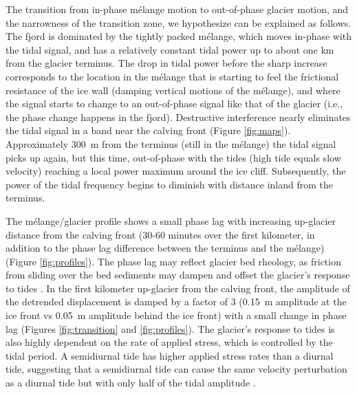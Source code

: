 The transition from in-phase m\'elange motion to out-of-phase glacier motion, and the narrowness of the transition zone, we hypothesize can be explained as follows. The fjord is dominated by the tightly packed m\'elange, which moves in-phase with the tidal signal, and has a relatively constant tidal power up to about one km from the glacier terminus. The drop in tidal power before the sharp increase corresponds to the  location in the m\'elange that is starting to feel the frictional resistance of the ice wall (damping vertical motions of the m\'elange), and where the signal starts to change to an out-of-phase signal like that of the glacier (i.e., the phase change happens in the fjord). Destructive interference nearly eliminates the tidal signal in a band near the calving front (Figure \ref{fig:maps}).  Approximately 300~m from the terminus (still in the m\'elange) the tidal signal picks up again, but this time, out-of-phase with the tides (high tide equals slow velocity) reaching a local power maximum around the ice cliff.  Subsequently, the power of the tidal frequency begins to diminish with distance inland from the terminus. 


The m\'elange/glacier profile shows a small phase lag with increasing up-glacier
distance from the calving front (30-60 minutes over the first
kilometer, in addition to the phase lag difference between the terminus and the m\'elange) (Figure \ref{fig:profiles}). The phase lag may reflect glacier bed rheology,
as friction from sliding over the bed sediments may dampen and offset
the glacier's response to tides \citep{walker2014ice}. 
In the first kilometer up-glacier from the calving front, the amplitude of the detrended displacement is damped by a factor of 3 (0.15~m amplitude at the ice front vs 0.05~m amplitude behind the ice front) with a small change in phase lag (Figures \ref{fig:transition} and \ref{fig:profiles}). The glacier's response to tides is also highly
dependent on the rate of applied stress, which is controlled by the
tidal period. A semidiurnal tide has higher applied stress rates than
a diurnal tide, suggesting that a semidiurnal tide can cause the same velocity perturbation as a diurnal tide but with only half of the tidal amplitude \citep{walker2014ice}.
  
